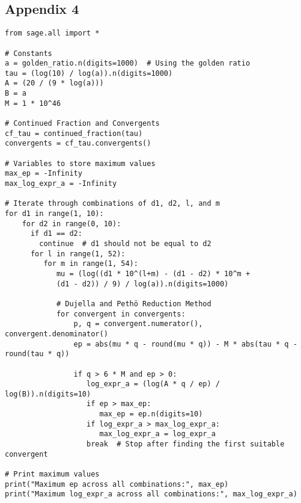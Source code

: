 \subsection*{Appendix 4}\label{app4}
\begin{verbatim}
from sage.all import *

# Constants
a = golden_ratio.n(digits=1000)  # Using the golden ratio
tau = (log(10) / log(a)).n(digits=1000)
A = (20 / (9 * log(a)))
B = a
M = 1 * 10^46

# Continued Fraction and Convergents
cf_tau = continued_fraction(tau)
convergents = cf_tau.convergents()

# Variables to store maximum values
max_ep = -Infinity
max_log_expr_a = -Infinity

# Iterate through combinations of d1, d2, l, and m
for d1 in range(1, 10):
    for d2 in range(0, 10):
      if d1 == d2:
        continue  # d1 should not be equal to d2
      for l in range(1, 52):
         for m in range(1, 54):
            mu = (log((d1 * 10^(l+m) - (d1 - d2) * 10^m + 
            (d1 - d2)) / 9) / log(a)).n(digits=1000)

            # Dujella and Pethö Reduction Method
            for convergent in convergents:
                p, q = convergent.numerator(), convergent.denominator()
                ep = abs(mu * q - round(mu * q)) - M * abs(tau * q - round(tau * q))

                if q > 6 * M and ep > 0:
                   log_expr_a = (log(A * q / ep) / log(B)).n(digits=10)
                   if ep > max_ep:
                      max_ep = ep.n(digits=10)
                   if log_expr_a > max_log_expr_a:
                      max_log_expr_a = log_expr_a
                   break  # Stop after finding the first suitable convergent

# Print maximum values
print("Maximum ep across all combinations:", max_ep)
print("Maximum log_expr_a across all combinations:", max_log_expr_a)	
\end{verbatim}	
